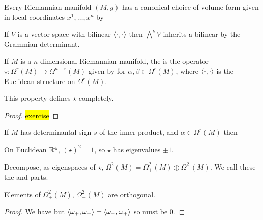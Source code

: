 \documentclass{article}
\begin{document}
\begin{lemma}
	Every Riemannian manifold $(M,g)$ has a canonical choice of volume form given in local coordinates $x^1, \dots, x^n$ by 
\end{lemma}

\begin{lemma}
	If $V$ is a vector space with bilinear $\left\langle \cdot, \cdot \right\rangle$ then $\bigwedge^k V$ inherits a bilinear by the Grammian determinant. 
\end{lemma}

\begin{definition}
	If $M$ is a $n$-dimensional Riemannian manifold, the  is the operator $\star : \Omega^r(M) \to \Omega^{n-r}(M)$ given by 
	for $\alpha,\beta \in \Omega^r(M)$, where $\left\langle \cdot,\cdot \right\rangle$ is the Euclidean structure on $\Omega^r(M)$. 
\end{definition}

\begin{lemma}
	This property defines $\star$ completely. 
\end{lemma}
\begin{proof}
	\hl{exercise}
\end{proof}

\begin{prop}
	If $M$ has determinantal sign $s$ of the inner product, and $\alpha \in \Omega^r(M)$ then 
\end{prop}
\begin{corollary}
	On Euclidean $\mathbb{R}^4$, $(\star)^2 = 1$, so $\star$ has eigenvalues $\pm 1$. 
\end{corollary}
\begin{definition}
	Decompose, as eigenspaces of $\star$, $\Omega^2(M) = \Omega^2_+(M) \oplus \Omega^2_-(M)$. We call these the  and  parts.
\end{definition}

\begin{lemma}
	Elements of $\Omega^2_+(M), \, \Omega^2_-(M)$ are orthogonal. 
\end{lemma}
\begin{proof}
	We have 
	but $\left\langle \omega_+, \omega_- \right\rangle = \left\langle \omega_-, \omega_+ \right\rangle$ so must be 0. 
\end{proof}
\end{document}
